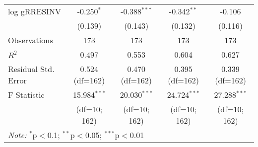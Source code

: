 \begin{table}[H]
\begin{tabular}{@{\extracolsep{5pt}}lcccc}
log gRRESINV & -0.250$^{*}$ & -0.388$^{***}$ & -0.342$^{**}$ & -0.106 \\
                   & (0.139) & (0.143) & (0.132) & (0.116) \\

\hline
Observations & 173 & 173 & 173 & 173 \\
$R^2$ & 0.497 & 0.553 & 0.604 & 0.627 \\
Residual Std. Error & 0.524 (df=162) & 0.470 (df=162) & 0.395 (df=162) & 0.339 (df=162) \\
F Statistic & 15.984$^{***}$ & 20.030$^{***}$ & 24.724$^{***}$ & 27.288$^{***}$ \\
            & (df=10; 162) & (df=10; 162) & (df=10; 162) & (df=10; 162) \\
\hline
\hline
\multicolumn{5}{l}{\textit{Note:} $^{*}$p$<$0.1; $^{**}$p$<$0.05; $^{***}$p$<$0.01} \\
\end{tabular}
\end{table}
